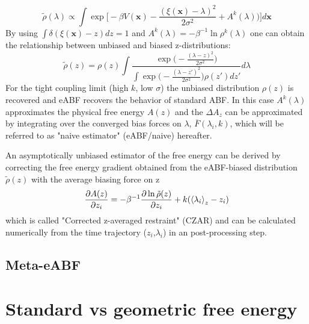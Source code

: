 \begin{equation}
  \tilde{\rho}(\lambda) \propto \int \exp \biggl[-\beta V(\textbf{x})-\frac{(\xi(\textbf{x})-\lambda)^2}{2\sigma^2} + A^{k}(\lambda) \biggr) \biggr] d\textbf{x}
\end{equation}
By using $\int \delta(\xi(\textbf{x})-z)dz=1$ and $A^k(\lambda)=-\beta^{-1}\ln\rho^k(\lambda)$ one can obtain the relationship between unbiased and biased z-distributions:
\begin{equation}
  \tilde{\rho}(z) =  \rho(z) \int \frac{\exp \bigl(-\frac{(\lambda-z)^2}{2\sigma^2}\bigr)}
  {\int \exp\bigl(-\frac{(\lambda-z')^2}{2\sigma^2}\bigr)\rho(z')dz'} d\lambda
\end{equation}
For the tight coupling limit (high $k$, low $\sigma$) the unbiased distribution $\rho(z)$ is recovered and eABF recovers the behavior of standard ABF.
In this case $A^k(\lambda)$  approximates the physical free energy $A(z)$ and the $\Delta A_{z}$ can be approximated by integrating over the converged bias forces on $\lambda$, $\overline{F}(\lambda_{i}, k)$, which will be referred to as "naive estimator" (eABF/naive) hereafter.

An asymptotically unbiased estimator of the free energy can be derived by correcting the free energy gradient obtained from the eABF-biased distribution $\tilde{\rho}(z)$ with the average biasing force on z
\begin{equation}
  \frac{\partial A(z)}{\partial z_i} = -\beta^{-1}\frac{\partial \ln \tilde{\rho}(z)}{\partial z_i} + k(\braket{\lambda_i}_{z}-z_{i})
\end{equation}
which is called "Corrected z-averaged restraint" (CZAR) and can be calculated numerically from the time trajectory ($z_i$,$\lambda_i$) in an post-processing step.\autocite{lesage2017smoothed}

\subsection{Meta-eABF}
\label{sec:meta-eABF}

\section{Standard vs geometric free energy}
